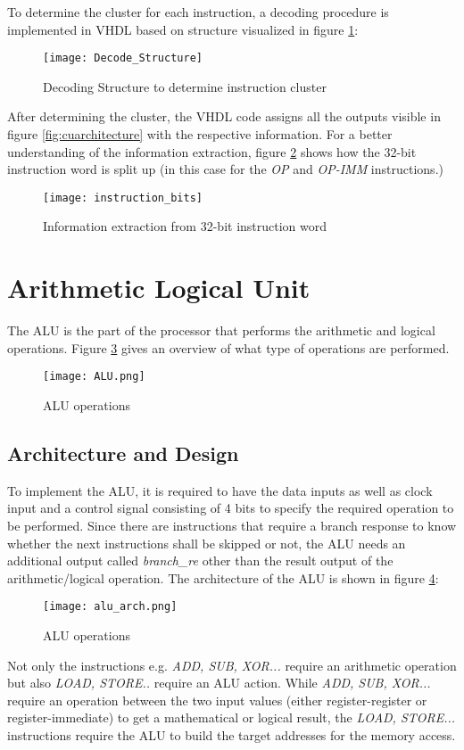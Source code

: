 To determine the cluster for each instruction, a decoding procedure is implemented in VHDL based on structure visualized in figure \ref{fig:decode_structure}:

\begin{figure}[H]
	\centering
	\texttt{[image: Decode\_Structure]}
	\caption{Decoding Structure to determine instruction cluster}
	\label{fig:decode_structure}
\end{figure}
After determining the cluster, the VHDL code assigns all the outputs visible in figure \ref{fig:cuarchitecture} with the respective information. For a better understanding of the information extraction, figure \ref{fig:instruction_bits} shows how the 32-bit instruction word is split up (in this case for the \textit{OP} and \textit{OP-IMM} instructions.)
\begin{figure}[H]
	\centering
	\texttt{[image: instruction\_bits]}
	\caption{Information extraction from 32-bit instruction word}
	\label{fig:instruction_bits}
\end{figure}


\section{Arithmetic Logical Unit}
The \acf{ALU} is the part of the processor that performs the arithmetic and logical operations. Figure \ref{fig:alu} gives an overview of what type of operations are performed.
\begin{figure}[H]
	\centering
	\texttt{[image: ALU.png]}
	\caption{ALU operations}
	\label{fig:alu}
\end{figure}

\subsection{Architecture and Design}
To implement the ALU, it is required to have the data inputs as well as clock input and a control signal consisting of 4 bits to specify the required operation to be performed. Since there are instructions that require a branch response to know whether the next instructions shall be skipped or not, the ALU needs an additional output called \textit{branch\_re} other than the result output of the arithmetic/logical operation. The architecture of the ALU is shown in figure \ref{fig:alu_arch}:
\begin{figure}[H]
	\centering
	\texttt{[image: alu\_arch.png]}
	\caption{ALU operations}
	\label{fig:alu_arch}
\end{figure}
Not only the instructions e.g. \textit{ADD, SUB, XOR...} require an arithmetic operation but also \textit{LOAD, STORE..} require an ALU action. While \textit{ADD, SUB, XOR...} require an operation between the two input values (either register-register or register-immediate) to get a mathematical or logical result, the \textit{LOAD, STORE...} instructions require the ALU to build the target addresses for the memory access.
